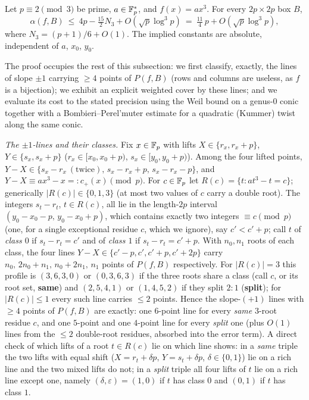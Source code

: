 \begin{theorem}\label{thm:cubic}
Let $p\equiv2\pmod3$ be prime, $a\in\mathbb{F}_p^*$, and $f(x)=ax^3$. For every $2p\times2p$ box $B$,
\[
\alpha(f,B)\ \le\ 4p-\tfrac{15}2N_3+O(\sqrt p\log^3p)\ =\ \tfrac{11}4\,p+O(\sqrt p\log^3p),
\]
where $N_3=(p+1)/6+O(1)$. The implied constants are absolute, independent of $a$, $x_0$, $y_0$.
\end{theorem}

The proof occupies the rest of this subsection: we first classify, exactly, the lines of slope $\pm1$ carrying $\ge4$
points of $P(f,B)$ (rows and columns are useless, as $f$ is a bijection); we exhibit an explicit weighted cover by
these lines; and we evaluate its cost to the stated precision using the Weil bound on a genus-$0$ conic together
with a Bombieri--Perel'muter estimate for a quadratic (Kummer) twist along the same conic.

\smallskip\noindent\emph{The $\pm1$-lines and their classes.} Fix $x\in\mathbb{F}_p$ with lifts $X\in\{r_x,r_x+p\}$,
$Y\in\{s_x,s_x+p\}$ ($r_x\in[x_0,x_0+p)$, $s_x\in[y_0,y_0+p)$). Among the four lifted points,
$Y-X\in\{s_x-r_x\ (\text{twice}),\,s_x-r_x+p,\,s_x-r_x-p\}$, and
$Y-X\equiv ax^3-x=:c_+(x)\pmod p$. For $c\in\mathbb{F}_p$ let $R(c)=\{t:at^3-t=c\}$; generically $|R(c)|\in\{0,1,3\}$ (at
most two values of $c$ carry a double root). The integers $s_t-r_t$, $t\in R(c)$, all lie in the length-$2p$ interval
$(y_0-x_0-p,\,y_0-x_0+p)$, which contains exactly two integers $\equiv c\pmod p$ (one, for a single exceptional
residue $c$, which we ignore), say $c'<c'+p$; call $t$ of
\emph{class $0$} if $s_t-r_t=c'$ and of \emph{class $1$} if $s_t-r_t=c'+p$. With $n_0,n_1$ roots of each class, the
four lines $Y-X\in\{c'-p,c',c'+p,c'+2p\}$ carry $n_0,\,2n_0+n_1,\,n_0+2n_1,\,n_1$ points of $P(f,B)$ respectively.
For $|R(c)|=3$ this profile is $(3,6,3,0)$ or $(0,3,6,3)$ if the three roots share a class (call $c$, or its root
set, \textbf{same}) and $(2,5,4,1)$ or $(1,4,5,2)$ if they split $2\!:\!1$ (\textbf{split}); for $|R(c)|\le1$ every
such line carries $\le2$ points. Hence the slope-$(+1)$ lines with $\ge4$ points of $P(f,B)$ are exactly: one
$6$-point line for every \emph{same} $3$-root residue $c$, and one $5$-point and one $4$-point line for every
\emph{split} one (plus $O(1)$ lines from the $\le2$ double-root residues, absorbed into the error term).
A direct check of which lifts of a root $t\in R(c)$ lie on which line shows: in a \emph{same} triple the two lifts
with equal shift ($X=r_t+\delta p,\,Y=s_t+\delta p$, $\delta\in\{0,1\}$) lie on a rich line and the two mixed lifts
do not; in a \emph{split} triple all four lifts of $t$ lie on a rich line except one, namely $(\delta,\varepsilon)=(1,0)$
if $t$ has class $0$ and $(0,1)$ if $t$ has class $1$.

